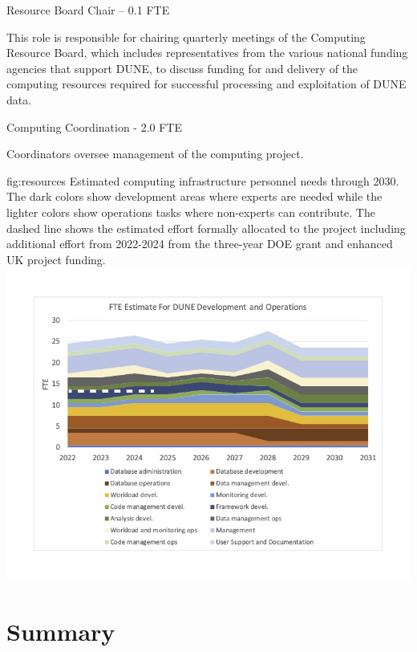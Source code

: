 \documentclass[../main-v1.tex]{subfiles}
\begin{document}
\begin{description}
\item {Resource Board Chair -- 0.1 FTE}

This role is responsible for chairing quarterly meetings of the Computing Resource Board, which includes representatives from the %
various national funding agencies that support DUNE, to discuss %
funding for and delivery of the computing resources required for successful processing and exploitation of DUNE data. %

\item {Computing Coordination - 2.0 FTE}

Coordinators oversee management of the computing project. 
\end{description}



\begin{dunefigure}
{fig:resources}
{Estimated computing infrastructure personnel needs through 2030.  The dark colors show development areas where experts are needed while the lighter colors show operations tasks where non-experts can contribute. The dashed line shows the estimated effort formally allocated to the project including additional effort from 2022-2024 from the three-year DOE grant and enhanced UK project funding.}
{\includegraphics[width=0.9 \textwidth]{graphics/Resources/FTENeeds-2022-03.jpg}}
\end{dunefigure}

\chapter{Summary}
\end{document}
